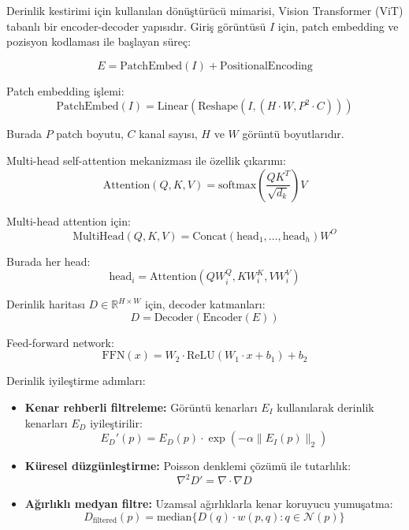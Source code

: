 \documentclass[12pt]{article}
\begin{document}
Derinlik kestirimi için kullanılan dönüştürücü mimarisi, Vision Transformer (ViT) tabanlı bir encoder-decoder yapısıdır. Giriş görüntüsü \(I\) için, patch embedding ve pozisyon kodlaması ile başlayan süreç:

\[ E = \text{PatchEmbed}(I) + \text{PositionalEncoding} \]

Patch embedding işlemi:
\[ \text{PatchEmbed}(I) = \text{Linear}(\text{Reshape}(I, (H \cdot W, P^2 \cdot C))) \]

Burada \(P\) patch boyutu, \(C\) kanal sayısı, \(H\) ve \(W\) görüntü boyutlarıdır.

Multi-head self-attention mekanizması ile özellik çıkarımı:
\[ \text{Attention}(Q,K,V) = \text{softmax}\left(\frac{QK^T}{\sqrt{d_k}}\right)V \]

Multi-head attention için:
\[ \text{MultiHead}(Q,K,V) = \text{Concat}(\text{head}_1, \ldots, \text{head}_h)W^O \]

Burada her head:
\[ \text{head}_i = \text{Attention}(QW_i^Q, KW_i^K, VW_i^V) \]

Derinlik haritası \(D \in \mathbb{R}^{H \times W}\) için, decoder katmanları:
\[ D = \text{Decoder}(\text{Encoder}(E)) \]

Feed-forward network:
\[ \text{FFN}(x) = W_2 \cdot \text{ReLU}(W_1 \cdot x + b_1) + b_2 \]

Derinlik iyileştirme adımları:
\begin{itemize}
\item \textbf{Kenar rehberli filtreleme:} Görüntü kenarları \(E_I\) kullanılarak derinlik kenarları \(E_D\) iyileştirilir:
\[ E_D'(p) = E_D(p) \cdot \exp(-\alpha \|E_I(p)\|_2) \]

\item \textbf{Küresel düzgünleştirme:} Poisson denklemi çözümü ile tutarlılık:
\[ \nabla^2 D' = \nabla \cdot \nabla D \]

\item \textbf{Ağırlıklı medyan filtre:} Uzamsal ağırlıklarla kenar koruyucu yumuşatma:
\[ D_{\text{filtered}}(p) = \text{median}\{D(q) \cdot w(p,q) : q \in \mathcal{N}(p)\} \]
\end{itemize}
\end{document}

